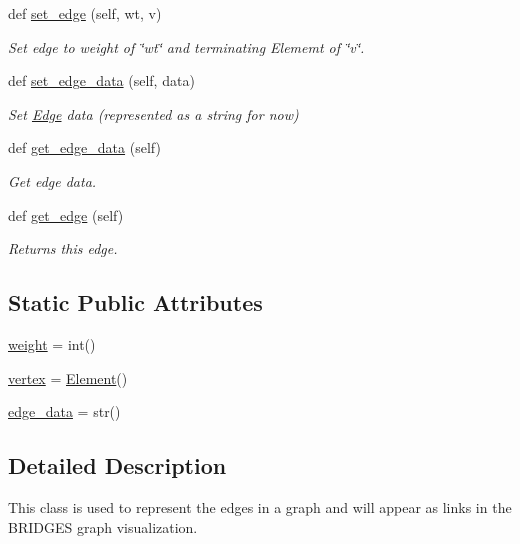 \begin{DoxyCompactItemize}
def \mbox{\hyperlink{class_bridges_1_1temp_1_1_edge_ac9eabd571940d72f50d3e253ab89bf64}{set\+\_\+edge}} (self, wt, v)
\begin{DoxyCompactList}\small\item\em Set edge to weight of \char`\"{}wt\char`\"{} and terminating Elememt of \char`\"{}v\char`\"{}. \end{DoxyCompactList}\item 
def \mbox{\hyperlink{class_bridges_1_1temp_1_1_edge_a560413418c786163b6222b6268d18a4a}{set\+\_\+edge\+\_\+data}} (self, data)
\begin{DoxyCompactList}\small\item\em Set \mbox{\hyperlink{class_bridges_1_1temp_1_1_edge}{Edge}} data (represented as a string for now) \end{DoxyCompactList}\item 
def \mbox{\hyperlink{class_bridges_1_1temp_1_1_edge_a3ac5fc36fd6372ceb17f841d8cfa4c22}{get\+\_\+edge\+\_\+data}} (self)
\begin{DoxyCompactList}\small\item\em Get edge data. \end{DoxyCompactList}\item 
def \mbox{\hyperlink{class_bridges_1_1temp_1_1_edge_a1d0153f17363a50aad3d9e28c9d23ad9}{get\+\_\+edge}} (self)
\begin{DoxyCompactList}\small\item\em Returns this edge. \end{DoxyCompactList}\end{DoxyCompactItemize}
\subsection*{Static Public Attributes}
\begin{DoxyCompactItemize}
\item 
\mbox{\hyperlink{class_bridges_1_1temp_1_1_edge_ad4176272c9d969f23adbeeb901e73615}{weight}} = int()
\item 
\mbox{\hyperlink{class_bridges_1_1temp_1_1_edge_a34c83e7b1c4cde4ee443df0e2c1451a1}{vertex}} = \mbox{\hyperlink{class_bridges_1_1_element_1_1_element}{Element}}()
\item 
\mbox{\hyperlink{class_bridges_1_1temp_1_1_edge_a34c9d5c0ba1f62155b267e921c50d42d}{edge\+\_\+data}} = str()
\end{DoxyCompactItemize}


\subsection{Detailed Description}
This class is used to represent the edges in a graph and will appear as links in the B\+R\+I\+D\+G\+ES graph visualization. 

